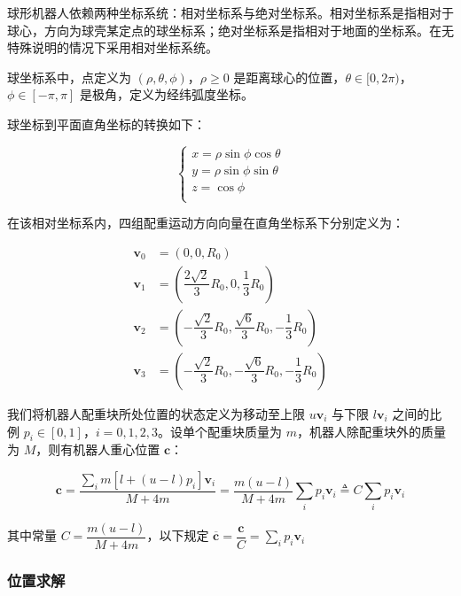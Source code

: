 \documentclass[a4paper]{ctexart}
\numberwithin{equation}{section}
\numberwithin{table}{section}
\numberwithin{figure}{section}
\begin{document}
球形机器人依赖两种坐标系统：相对坐标系与绝对坐标系。相对坐标系是指相对于球心，方向为球壳某定点的球坐标系；绝对坐标系是指相对于地面的坐标系。在无特殊说明的情况下采用相对坐标系统。

球坐标系中，点定义为 $(\rho, \theta, \phi)$，$\rho\ge 0$ 是距离球心的位置，$\theta \in [0,2\pi)$，$\phi \in [-\pi, \pi]$ 是极角，定义为经纬弧度坐标。

球坐标到平面直角坐标的转换如下：

\begin{equation}
\begin{cases}
  x = \rho\sin\phi\cos\theta \\
  y = \rho\sin\phi\sin\theta \\
  z = \cos\phi \\
\end{cases}
\end{equation}

在该相对坐标系内，四组配重运动方向向量在直角坐标系下分别定义为：

\begin{align}
  \boldsymbol v_0 & = (0,0,R_0) \\
  \boldsymbol v_1 & = (\dfrac{2\sqrt{2}}{3}R_0,0,\dfrac{1}{3}R_0) \\
  \boldsymbol v_2 & = (-\dfrac{\sqrt{2}}{3}R_0,\dfrac{\sqrt{6}}{3}R_0,-\dfrac{1}{3}R_0) \\
  \boldsymbol v_3 & = (-\dfrac{\sqrt{2}}{3}R_0,-\dfrac{\sqrt{6}}{3}R_0,-\dfrac{1}{3}R_0)
\end{align}

我们将机器人配重块所处位置的状态定义为移动至上限 $u\boldsymbol v_i$ 与下限 $l\boldsymbol v_i$ 之间的比例 $p_i\in[0,1]$，$i = 0,1,2,3$。设单个配重块质量为 $m$，机器人除配重块外的质量为 $M$，则有机器人重心位置 $\boldsymbol c$：

\begin{equation}
  \boldsymbol c = \frac{\sum_i m [l + (u-l) p_i] \boldsymbol v_i}{M + 4m} = \frac{m (u-l)}{M + 4m}\sum_i p_i \boldsymbol v_i \triangleq C \sum_i p_i \boldsymbol v_i
  \label{equ_center}
\end{equation}

其中常量 $C=\dfrac{m (u-l)}{M + 4m}$，以下规定 $\overline{\boldsymbol c} = \dfrac{\boldsymbol c}{C} = \sum_i p_i \boldsymbol v_i$

\subsubsection{位置求解}
\end{document}
